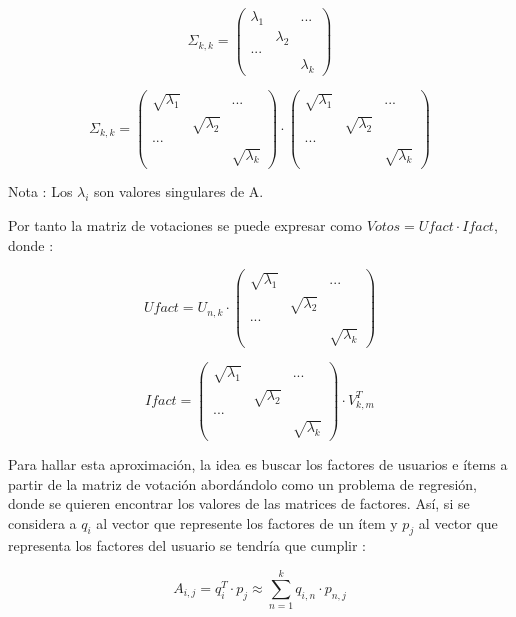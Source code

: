 \documentclass{article}
\begin{document}
$$
\Sigma_{k,k} = 
\left(
\begin{matrix}
\lambda_{1} &  & ...\\
& \lambda_{2}\\
... \\
& & \lambda_{k}
\end{matrix}
\right)
$$

$$
\Sigma_{k,k} = 
\left(
\begin{matrix}
\sqrt{\lambda_{1}} &  & ...\\
& \sqrt{\lambda_{2}}\\
... \\
& & \sqrt{\lambda_{k}}
\end{matrix}
\right) 
\cdot 
\left(
\begin{matrix}
\sqrt{\lambda_{1}} &  & ...\\
& \sqrt{\lambda_{2}}\\
... \\
& & \sqrt{\lambda_{k}}
\end{matrix}
\right)
$$

Nota : Los $\lambda_{i}$ son valores singulares de A.

Por tanto la matriz de votaciones se puede expresar como $Votos = Ufact\cdot Ifact$, donde :

$$
Ufact = U_{n, k} \cdot
\left(
\begin{matrix}
\sqrt{\lambda_{1}} &  & ...\\
& \sqrt{\lambda_{2}}\\
... \\
& & \sqrt{\lambda_{k}}
\end{matrix}
\right)
$$


$$
Ifact =
\left(\begin{matrix}
\sqrt{\lambda_{1}} &  & ...\\
& \sqrt{\lambda_{2}}\\
... \\
& & \sqrt{\lambda_{k}}
\end{matrix}
\right)
\cdot
V^T_{k, m}  
$$

Para hallar esta aproximación, la idea es buscar los 
factores de usuarios e ítems a partir de la matriz 
de votación abordándolo como un problema de 
regresión, donde se quieren encontrar los valores 
de las matrices de factores. Así, si se 
considera a $q_{i}$ al vector que represente los 
factores de un ítem y $p_{j}$ al vector que representa 
los factores del usuario se tendría que cumplir :

$$
A_{i, j} = q^T_{i} \cdot p_{j} \approx \sum_{n = 1}^{k} q_{i, n}\cdot p_{n, j}
$$
\end{document}
